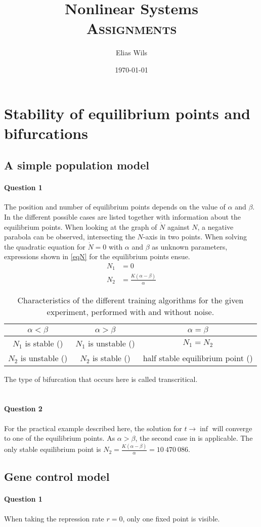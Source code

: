 \documentclass[a4paper,11pt]{article}
\title{Nonlinear Systems \\[1ex]
    \Large \textsc{Assignments}}
\author{Elias Wils}
\date{\today}
\begin{document}
\maketitle
\newpage
\tableofcontents

\newpage
\section{Stability of equilibrium points and \\bifurcations}    
\subsection{A simple population model}
\paragraph{Question 1}\: The position and number of equilibrium points depends on the value of $\alpha$ and $\beta$.
In  the different possible cases are listed together with information about the equilibrium points.
When looking at the graph of $\dot{N}$ against $N$, a negative parabola can be observed, intersecting the $N$-axis in two points.
When solving the quadratic equation for $\dot{N}=0$ with $\alpha$ and $\beta$ as unknown parameters, expressions shown in \eqref{eqN} for
the equilibrium points ensue.
\begin{align}
	N_1 &= 0\\
	N_2 &= \frac{K(\alpha-\beta)}{\alpha}
	\label{eqN}
\end{align}
\begin{table}[H]
	\centering
	\begin{tabular}{|c|c|c|}
	\hline
	$\alpha<\beta$ & $\alpha>\beta$ & $\alpha=\beta$\\
	\hline
	$N_1$ is stable (\CIRCLE) & $N_1$ is unstable (\Circle) & $N_1=N_2$\\
	$N_2$ is unstable (\Circle) & $N_2$ is stable (\CIRCLE) & half stable equilibrium point (\RIGHTcircle)\\
	\hline
	\end{tabular}
	\caption{Characteristics of the different training algorithms for the given experiment, performed with and without noise. }
	\label{tbeq1}
\end{table}
The type of bifurcation that occurs here is called transcritical.\\\\
\paragraph{Question 2}\: For the practical example described here, the solution for $t\rightarrow\inf$ will converge to one 
of the equilibrium points. As $\alpha>\beta$, the second case in  is applicable. The only stable equilibrium point
is $N_2=\frac{K(\alpha-\beta)}{\alpha}=10\:470\:086$.\\

\subsection{Gene control model}
\paragraph{Question 1}\: When taking the repression rate $r=0$, only one fixed point is visible.
\end{document}
